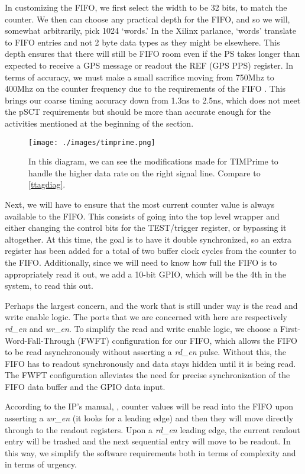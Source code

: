 In customizing the FIFO, we first select the width to be 32 bits, to match the counter. We then can choose any practical depth for the FIFO, and so we will, somewhat arbitrarily, pick 1024 `words.' In the Xilinx parlance, `words' translate to FIFO entries and not 2 byte data types as they might be elsewhere. This depth ensures that there will still be FIFO room even if the PS takes longer than expected to receive a GPS message or readout the REF (GPS PPS) register. In terms of accuracy, we must make a small sacrifice moving from 750Mhz to 400Mhz on the counter frequency due to the requirements of the FIFO \cite{fifo}. This brings our coarse timing accuracy down from 1.3ns to 2.5ns, which does not meet the pSCT requirements but should be more than accurate enough for the activities mentioned at the beginning of the section. 
\label{timprime}
\begin{figure}[H]
\centering
\texttt{[image: ./images/timprime.png]}
\caption[TIMPrime Time-Tagging PL]{In this diagram, we can see the modifications made for TIMPrime to handle the higher data rate on the right signal line. Compare to \autoref{ttagdiag}.}
\label{timprime}
\end{figure}
Next, we will have to ensure that the most current counter value is always available to the FIFO. This consists of going into the top level wrapper and either changing the control bits for the TEST/trigger register, or bypassing it altogether. At this time, the goal is to have it double synchronized, so an extra register has been added for a total of two buffer clock cycles from the counter to the FIFO. Additionally, since we will need to know how full the FIFO is to appropriately read it out, we add a 10-bit GPIO, which will be the 4th in the system, to read this out. 

Perhaps the largest concern, and the work that is still under way is the read and write enable logic. The ports that we are concerned with here are respectively \textit{rd\_en} and \textit{wr\_en}. To simplify the read and write enable logic, we choose a First-Word-Fall-Through (FWFT) configuration for our FIFO, which allows the FIFO to be read asynchronously without asserting a \textit{rd\_en} pulse. Without this, the FIFO has to readout synchronously and data stays hidden until it is being read. The FWFT configuration alleviates the need for precise synchronization of the FIFO data buffer and the GPIO data input. 

According to the IP's manual, \textcite{fifo}, counter values will be read into the FIFO upon asserting a \textit{wr\_en} (it looks for a leading edge) and then they will move directly through to the readout registers. Upon a \textit{rd\_en} leading edge, the current readout entry will be trashed and the next sequential entry will move to be readout. In this way, we simplify the software requirements both in terms of complexity and in terms of urgency. 

